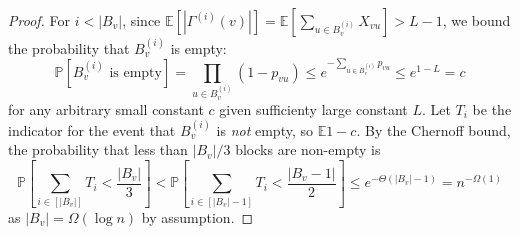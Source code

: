 \EmptyBlock*
\begin{proof}
For $i < |B_v|$, since $ \mathbb{E} \left[ |\Gamma^{(i)}(v)| \right] =\mathbb{E} \left[ \sum_{u\in B_v^{(i)}} X_{vu} \right] > L-1$, we bound the probability that $B_v^{(i)}$ is empty:
\[
\mathbb P[B_v^{(i)}\textrm{ is empty}] = \prod_{u\in B_v^{(i)}} (1-p_{vu}) \leq e^{-\sum_{u\in B_v^{(i)}} p_{vu}} \leq e^{1-L}=c
\]
for any arbitrary small constant $c$ given sufficienty large constant $L$. Let $T_{i}$ be the indicator for the event that $B_v^{(i)}$ is \emph{not} empty, so $\mathbb E 1-c$. By the Chernoff bound, the probability that less than $|B_v|/3$ blocks are non-empty is 
\[
\textstyle
\mathbb P\left[\sum_{i\in[|B_v|]} T_i<\frac{|B_v|}{3}\right]<\mathbb P\left[\sum_{i\in[|B_v|-1]} T_i<\frac{|B_v-1|}{2}\right]\leq e^{-\Theta(|B_v|-1)} = n^{-\Omega(1)}
\] as $|B_v| = \Omega(\log n)$ by assumption.
\end{proof}
